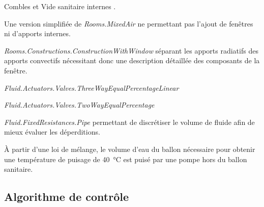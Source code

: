 \begin{blockdescription}{Combles et Vide sanitaire}
          internes \parencite{Wetter2011}.
    \item [Combles et Vide sanitaire] Une version simplifiée de \textit{Rooms.MixedAir}
          ne permettant pas l’ajout de fenêtres ni d’apports internes.
    \item [Fenêtres] \textit{Rooms.Constructions.ConstructionWithWindow} séparant
          les apports radiatifs des apports convectifs nécessitant donc une description
          détaillée des composants de la fenêtre.
    \item [Vanne $\bm{3}$ voies] \textit{Fluid.Actuators.Valves.ThreeWayEqualPercentageLinear}
    \item [Vanne $\bm{2}$ voies] \textit{Fluid.Actuators.Valves.TwoWayEqualPercentage}
    \item [Canalisation extérieures] \textit{Fluid.FixedResistances.Pipe} permettant
          de discrétiser le volume de fluide afin de mieux évaluer les déperditions.
    \item [Puisage] À partir d’une loi de mélange, le volume d’eau du ballon nécessaire
          pour obtenir une température de puisage de \SI{40}{\celsius} est puisé
          par une pompe hors du ballon sanitaire.
\end{blockdescription}



\subsection{Algorithme de contrôle} %
\label{sub:algorithme_de_controle}
